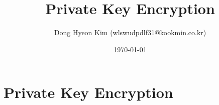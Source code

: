 \documentclass[10pt, a4paper]{report}
\title{Private Key Encryption}
\author{Dong Hyeon Kim (wlswudpdlf31@kookmin.co.kr)}
\date{\today}
\begin{document}
\tableofcontents

\chapter{Private Key Encryption}





% 
\end{document}
